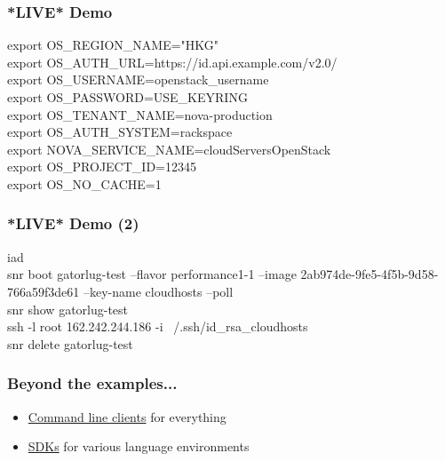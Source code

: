 \begin{frame}
\frametitle{*LIVE* Demo}

\begin{tt}
export OS\_REGION\_NAME="HKG" \\
export OS\_AUTH\_URL=https://id.api.example.com/v2.0/ \\
export OS\_USERNAME=openstack\_username \\
export OS\_PASSWORD=USE\_KEYRING \\
export OS\_TENANT\_NAME=nova-production \\
export OS\_AUTH\_SYSTEM=rackspace \\
export NOVA\_SERVICE\_NAME=cloudServersOpenStack \\
export OS\_PROJECT\_ID=12345 \\
export OS\_NO\_CACHE=1
\end{tt}
\end{frame}

\begin{frame}
\frametitle{*LIVE* Demo (2)}

\begin{tt}


iad \\
snr boot gatorlug-test --flavor performance1-1 --image 2ab974de-9fe5-4f5b-9d58-766a59f3de61 --key-name cloudhosts --poll \\
snr show gatorlug-test \\
ssh -l root 162.242.244.186 -i ~/.ssh/id\_rsa\_cloudhosts \\
snr delete gatorlug-test \\
\end{tt}
\end{frame}

\begin{frame}
\frametitle{Beyond the examples...}


\begin{itemize}

\item \href{http://docs.openstack.org/user-guide/content/install\_clients.html}{Command line clients} for everything

\item \href{http://docs.rackspace.com}{SDKs} for various language environments
\end{itemize}

\end{frame}

